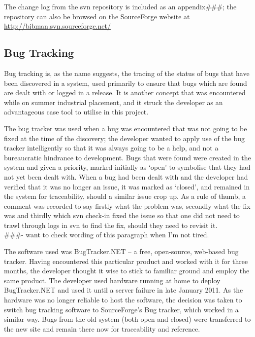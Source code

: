 \documentclass{l4proj}
\newcommand{\revisit}{\#\#\#}
\begin{document}
The change log from the \gls{svn} repository is included as an appendix\revisit; the repository can also be browsed on the SourceForge website at \url{http://bibman.svn.sourceforge.net/}

\subsection{Bug Tracking}
\label{bugTracking}
Bug tracking is, as the name suggests, the tracing of the status of bugs that have been discovered in a system, used primarily to ensure that bugs which are found are dealt with or logged in a release.  It is another concept that was encountered while on summer industrial placement, and it struck the developer as an advantageous \gls{case} tool to utilise in this project.

The bug tracker was used when a bug was encountered that was not going to be fixed at the time of the discovery; the developer wanted to apply use of the bug tracker intelligently so that it was always going to be a help, and not a bureaucratic hindrance to development.  Bugs that were found were created in the system and given a priority, marked initially as `open' to symbolise that they had not yet been dealt with.  When a bug had been dealt with and the developer had verified that it was no longer an issue, it was marked as `closed', and remained in the system for traceability, should a similar issue crop up.  As a rule of thumb, a comment was recorded to say firstly what the problem was, secondly what the fix was and thirdly which \gls{svn} check-in fixed the issue so that one did not need to trawl through logs in \gls{svn} to find the fix, should they need to revisit it.\\ \revisit - want to check wording of this paragraph when I'm not tired.

The software used was BugTracker.NET -- a free, open-source, web-based bug tracker.  Having encountered this particular product and worked with it for three months, the developer thought it wise to stick to familiar ground and employ the same product.  The developer used hardware running at home to deploy BugTracker.NET and used it until a server failure in late January 2011.  As the hardware was no longer reliable to host the software, the decision was taken to switch bug tracking software to SourceForge's Bug tracker, which worked in a similar way.  Bugs from the old system (both open and closed) were transferred to the new site and remain there now for traceability and reference. \\
\end{document}
